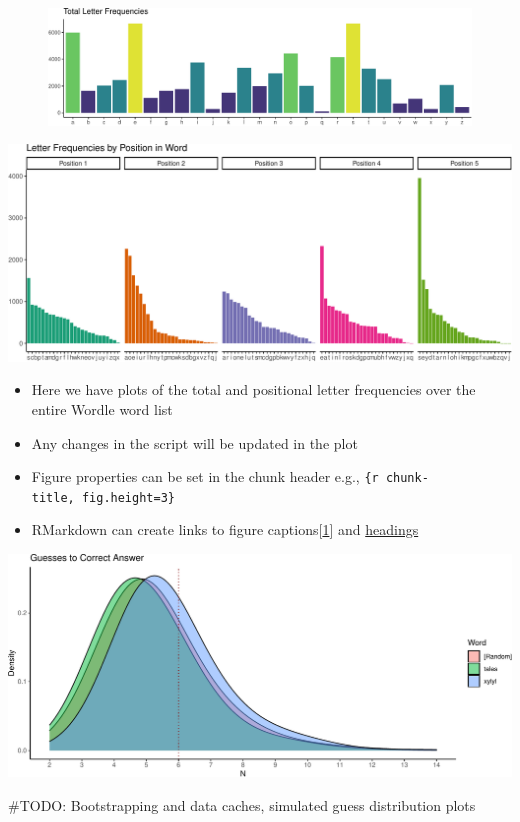 \documentclass[
]{article}
\begin{document}
\begin{figure}
\centering
\includegraphics{report_files/figure-latex/letter-1.pdf}
\caption{\label{fig:fig-1}}
\end{figure}

\includegraphics{report_files/figure-latex/positional-1.pdf}

\begin{itemize}
\item
  Here we have plots of the total and positional letter frequencies over
  the entire Wordle word list
\item
  Any changes in the script will be updated in the plot
\item
  Figure properties can be set in the chunk header e.g.,
  \texttt{\{r\ chunk-title,\ fig.height=3\}}
\item
  RMarkdown can create links to figure captions{[}\ref{fig:fig-1}{]} and
  \protect\hyperlink{initial-setup}{headings}
\end{itemize}

\includegraphics{report_files/figure-latex/bootstrapping-1.pdf}

\#TODO: Bootstrapping and data caches, simulated guess distribution
plots
\end{document}
